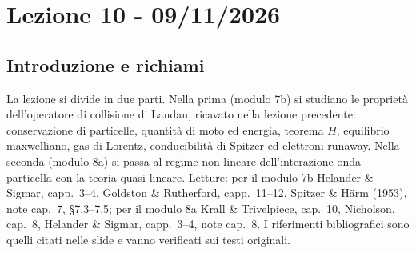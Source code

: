 \chapter{Lezione 10 - 09/11/2026}

\section{Introduzione e richiami}
La lezione si divide in due parti. Nella prima (modulo 7b) si studiano le proprietà dell'operatore di collisione di Landau, ricavato nella lezione precedente: conservazione di particelle, quantità di moto ed energia, teorema $H$, equilibrio maxwelliano, gas di Lorentz, conducibilità di Spitzer ed elettroni runaway. Nella seconda (modulo 8a) si passa al regime non lineare dell'interazione onda--particella con la teoria quasi-lineare. Letture: per il modulo 7b Helander \& Sigmar, capp.~3--4, Goldston \& Rutherford, capp.~11--12, Spitzer \& H\"arm (1953), note cap.~7, \S7.3--7.5; per il modulo 8a Krall \& Trivelpiece, cap.~10, Nicholson, cap.~8, Helander \& Sigmar, capp.~3--4, note cap.~8. I riferimenti bibliografici sono quelli citati nelle slide e vanno verificati sui testi originali.

